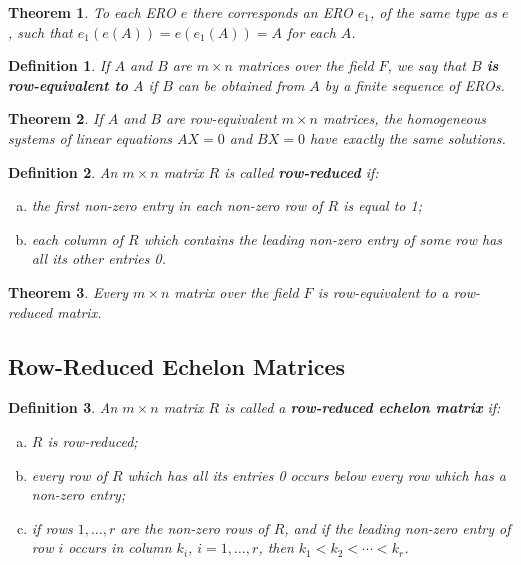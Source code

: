 \documentclass{article}
\newtheorem{theorem}{Theorem}
\newtheorem*{definition*}{Definition}
\begin{document}
\begin{theorem}
  To each ERO $e$ there corresponds an ERO $e_1$, of the same type as $e$, such
  that $e_1(e(A)) = e(e_1(A)) = A$ for each $A$.
\end{theorem}

\begin{definition*}
  If $A$ and $B$ are $m \times n$ matrices over the field $F$, we say that $B$
  \textbf{is row-equivalent to} $A$ if $B$ can be obtained from $A$ by a finite
  sequence of EROs.
\end{definition*}

\begin{theorem}
  If $A$ and $B$ are row-equivalent $m \times n$ matrices, the homogeneous
  systems of linear equations $AX = 0$ and $BX = 0$ have exactly the same
  solutions.
\end{theorem}

\begin{definition*}
  An $m \times n$ matrix $R$ is called \textbf{row-reduced} if:
  \begin{enumerate}[(a)]
    \item the first non-zero entry in each non-zero row of $R$ is equal to 1;
    \item each column of $R$ which contains the leading non-zero entry of some
      row has all its other entries 0.
  \end{enumerate}
\end{definition*}

\begin{theorem}
  Every $m \times n$ matrix over the field $F$ is row-equivalent to a
  row-reduced matrix.
\end{theorem}

\subsection{Row-Reduced Echelon Matrices}

\begin{definition*}
  An $m \times n$ matrix $R$ is called a \textbf{row-reduced echelon matrix} if:
  \begin{enumerate}[(a)]
    \item $R$ is row-reduced;
    \item every row of $R$ which has all its entries 0 occurs below every row
      which has a non-zero entry;
    \item if rows $1, \ldots, r$ are the non-zero rows of $R$, and if the
      leading non-zero entry of row $i$ occurs in column $k_i$, $i = 1, \ldots,
      r$, then $k_1 < k_2 < \cdots < k_r$.
  \end{enumerate}
\end{definition*}
\end{document}
